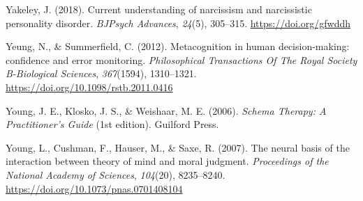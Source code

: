 \documentclass[
  donotrepeattitle,doc, 12pt, a4paper,floatsintext]{apa7}
\newlength{\cslhangindent}
\newlength{\cslentryspacingunit} %
\newenvironment{CSLReferences}[2] %
 {%
  \setlength{\parindent}{0pt}
  \ifodd #1
  \let\oldpar\par
  \def\par{\hangindent=\cslhangindent\oldpar}
  \fi
  \setlength{\parskip}{#2\cslentryspacingunit}
 }%
 {}
\begin{document}
\begin{CSLReferences}{1}{0}
\leavevmode{}%
Yakeley, J. (2018). Current understanding of narcissism and narcissistic personality disorder. \emph{BJPsych Advances}, \emph{24}(5), 305--315. \url{https://doi.org/gfwddh}

\leavevmode{}%
Yeung, N., \& Summerfield, C. (2012). Metacognition in human decision-making: confidence and error monitoring. \emph{Philosophical Transactions Of The Royal Society B-Biological Sciences}, \emph{367}(1594), 1310--1321. \url{https://doi.org/10.1098/rstb.2011.0416}

\leavevmode{}%
Young, J. E., Klosko, J. S., \& Weishaar, M. E. (2006). \emph{Schema Therapy: A Practitioner's Guide} (1st edition). Guilford Press.

\leavevmode{}%
Young, L., Cushman, F., Hauser, M., \& Saxe, R. (2007). The neural basis of the interaction between theory of mind and moral judgment. \emph{Proceedings of the National Academy of Sciences}, \emph{104}(20), 8235--8240. \url{https://doi.org/10.1073/pnas.0701408104}

\end{CSLReferences}

\endgroup

\newpage
\end{document}
